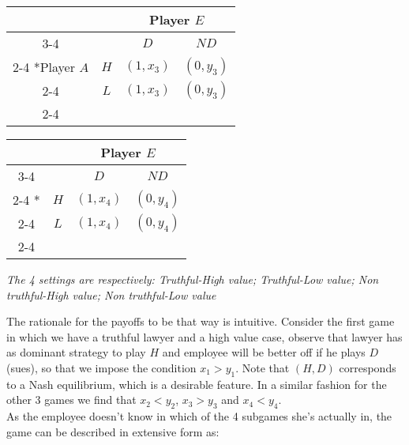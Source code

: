     \begin{table}[H]
      \begin{center}
    \setlength{\extrarowheight}{2pt}
        \begin{tabular}{*{4}{c|}}
      \multicolumn{2}{c}{} & \multicolumn{2}{c}{Player $E$}\\\cline{3-4}
      \multicolumn{1}{c}{} &  & $D$  & $ND$ \\\cline{2-4}
      \multirow{2}*{Player $A$}  & $H$ & $(1,x_3)$ & $(0,y_3)$ \\\cline{2-4}
      & $L$ & $(1,x_3)$ & $(0,y_3)$ \\\cline{2-4}
    \end{tabular}
        \begin{tabular}{*{4}{c|}}
      \multicolumn{2}{c}{} & \multicolumn{2}{c}{Player $E$}\\\cline{3-4}
      \multicolumn{1}{c}{} &  & $D$  & $ND$ \\\cline{2-4}
      \multirow{2}*{}  & $H$ & $(1,x_4)$ & $(0,y_4)$ \\\cline{2-4}
      & $L$ & $(1,x_4)$ & $(0,y_4)$ \\\cline{2-4}
    \end{tabular}
        \end{center}
   \footnotesize
    \textit{The 4 settings are respectively: Truthful-High value; Truthful-Low value; Non truthful-High value; Non truthful-Low value}         
  \end{table}

The rationale for the payoffs to be that way is intuitive. Consider the first game in which we have a truthful lawyer and a high value case, observe that lawyer has as dominant strategy to play $H$ and employee will be better off if he plays $D$ (sues), so that we impose the condition $x_1>y_1$. Note that $(H, D)$ corresponds to a Nash equilibrium, which is a desirable feature. In a similar fashion for the other 3 games we find that $x_2<y_2$, $x_3>y_3$ and $x_4<y_4$.\\

As the employee doesn't know in which of the 4 subgames she's actually in, the game can be described in extensive form as:
  
  
  
